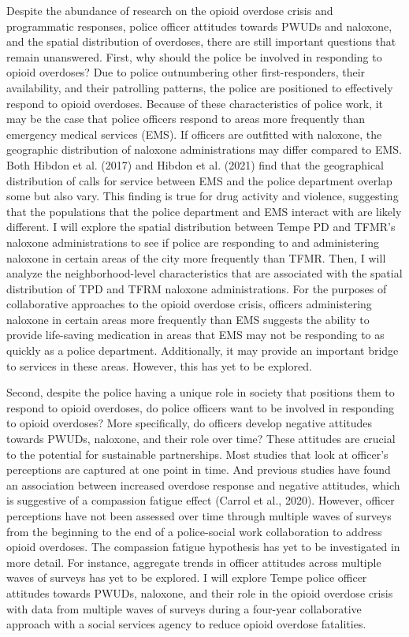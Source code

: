 Despite the abundance of research on the opioid overdose crisis and programmatic responses, police officer attitudes towards PWUDs and naloxone, and the spatial distribution of overdoses, there are still important questions that remain unanswered. First, why should the police be involved in responding to opioid overdoses? Due to police outnumbering other first-responders, their availability, and their patrolling patterns, the police are positioned to effectively respond to opioid overdoses. Because of these characteristics of police work, it may be the case that police officers respond to areas more frequently than emergency medical services (EMS). If officers are outfitted with naloxone, the geographic distribution of naloxone administrations may differ compared to EMS. Both Hibdon et al. (2017) and Hibdon et al. (2021) find that the geographical distribution of calls for service between EMS and the police department overlap some but also vary. This finding is true for drug activity and violence, suggesting that the populations that the police department and EMS interact with are likely different. I will explore the spatial distribution between Tempe PD and TFMR’s naloxone administrations to see if police are responding to and administering naloxone in certain areas of the city more frequently than TFMR. Then, I will analyze the neighborhood-level characteristics that are associated with the spatial distribution of TPD and TFRM naloxone administrations. For the purposes of collaborative approaches to the opioid overdose crisis, officers administering naloxone in certain areas more frequently than EMS suggests the ability to provide life-saving medication in areas that EMS may not be responding to as quickly as a police department. Additionally, it may provide an important bridge to services in these areas. However, this has yet to be explored.

Second, despite the police having a unique role in society that positions them to respond to opioid overdoses, do police officers want to be involved in responding to opioid overdoses? More specifically, do officers develop negative attitudes towards PWUDs, naloxone, and their role over time? These attitudes are crucial to the potential for sustainable partnerships. Most studies that look at officer’s perceptions are captured at one point in time. And previous studies have found an association between increased overdose response and negative attitudes, which is suggestive of a compassion fatigue effect (Carrol et al., 2020). However, officer perceptions have not been assessed over time through multiple waves of surveys from the beginning to the end of a police-social work collaboration to address opioid overdoses. The compassion fatigue hypothesis has yet to be investigated in more detail. For instance, aggregate trends in officer attitudes across multiple waves of surveys has yet to be explored. I will explore Tempe police officer attitudes towards PWUDs, naloxone, and their role in the opioid overdose crisis with data from multiple waves of surveys during a four-year collaborative approach with a social services agency to reduce opioid overdose fatalities. 

